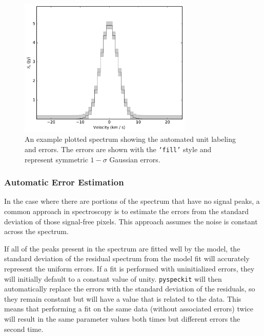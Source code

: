 \documentclass[twocolumn,linenumbers]{aastex63}
\newcommand{\pyspeckit}{\texttt{pyspeckit}\xspace}
\begin{document}
\begin{figure}[!htp]
\includegraphics[scale=1,width=3.25in]{example_fig_1.pdf}
\caption{An example plotted spectrum showing the automated unit labeling
and errors.  The errors are shown with the \texttt{`fill'} style
and represent symmetric $1-\sigma$ Gaussian errors.  }
\label{fig:example1}
\end{figure}




\subsubsection{Automatic Error Estimation}
\label{sec:autoerror}
In the case where there are portions of the spectrum that have no
signal peaks, a common approach in spectroscopy is to estimate the
errors from the standard deviation of those signal-free pixels.  This approach
assumes the noise is constant across the spectrum.

If all of the peaks present
in the spectrum are fitted well by the model,
the standard deviation of the residual spectrum from the model fit will
accurately represent the uniform errors.     If a fit is performed with
uninitialized errors, they will initially default to a constant value of unity. 
\pyspeckit will then automatically replace the errors with the
standard deviation of the residuals, so they remain constant but will have a value that is related to the data.
This means that performing a fit on the
same data (without associated errors) twice will result in the same parameter
values both times but different errors the second time.
\end{document}
